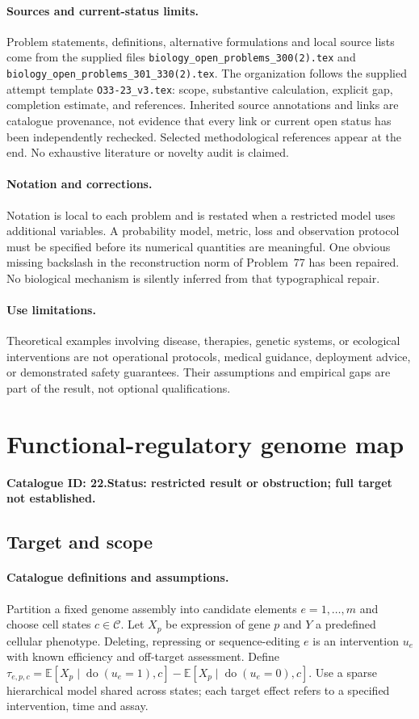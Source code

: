 \documentclass[11pt]{article}
\newcommand{\E}{\mathbb E}
\providecommand{\E}{\mathbb E}
\begin{document}
\paragraph{Sources and current-status limits.}
Problem statements, definitions, alternative formulations and local source lists
come from the supplied files
\texttt{biology\_open\_problems\_300(2).tex} and
\texttt{biology\_open\_problems\_301\_330(2).tex}.
The organization follows the supplied attempt template
\texttt{O33-23\_v3.tex}: scope, substantive calculation, explicit gap,
completion estimate, and references. Inherited source annotations and links are
catalogue provenance, not evidence that every link or current open status has
been independently rechecked. Selected methodological references appear at the
end. No exhaustive literature or novelty audit is claimed.

\paragraph{Notation and corrections.}
Notation is local to each problem and is restated when a restricted model uses
additional variables. A probability model, metric, loss and observation protocol
must be specified before its numerical quantities are meaningful. One obvious
missing backslash in the reconstruction norm of Problem~77 has been repaired.
No biological mechanism is silently inferred from that typographical repair.

\paragraph{Use limitations.}
Theoretical examples involving disease, therapies, genetic systems, or ecological
interventions are not operational protocols, medical guidance, deployment advice,
or demonstrated safety guarantees. Their assumptions and empirical gaps are part
of the result, not optional qualifications.

\setcounter{section}{21}
\section{Functional-regulatory genome map}
\label{prob:022}
\noindent\textbf{Catalogue ID: 22.}\quad \textbf{Status: restricted result or obstruction; full target not established.}
\subsection{Target and scope}
\paragraph{Catalogue definitions and assumptions.}
Partition a fixed genome assembly into candidate elements $e=1,\ldots,m$ and choose cell states $c\in\mathcal C$. Let $X_p$ be expression of gene $p$ and $Y$ a predefined cellular phenotype. Deleting, repressing or sequence-editing $e$ is an intervention $u_e$ with known efficiency and off-target assessment. Define $\tau_{e,p,c}=\E[X_p\mid\operatorname{do}(u_e=1),c]-\E[X_p\mid\operatorname{do}(u_e=0),c]$. Use a sparse hierarchical model shared across states; each target effect refers to a specified intervention, time and assay.
\end{document}

